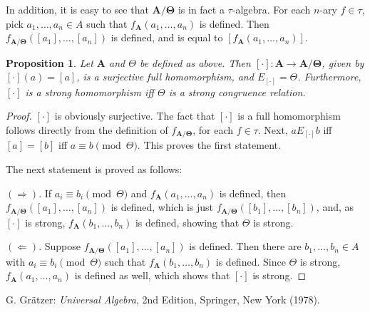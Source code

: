 \documentclass[12pt]{article}
\newtheorem{prop}{Proposition}
\begin{document}
In addition, it is easy to see that $\boldsymbol{A/\Theta}$ is in fact a $\tau$-algebra.  For each $n$-ary $f\in \tau$, pick $a_1,\ldots, a_n\in A$ such that $f_{\boldsymbol{A}}(a_1,\ldots, a_n)$ is defined.  Then $f_{\boldsymbol{A/\Theta}}([a_1],\ldots, [a_n])$ is defined, and is equal to $[f_{\boldsymbol{A}}(a_1,\ldots, a_n)]$.

\begin{prop} Let $\boldsymbol{A}$ and $\Theta$ be defined as above.  Then $[\cdot]:\boldsymbol{A}\to \boldsymbol{A/\Theta}$, given by $[\cdot](a)=[a]$, is a surjective full homomorphism, and $E_{[\cdot]}=\Theta$.  Furthermore, $[\cdot]$ is a strong homomorphism iff $\Theta$ is a strong congruence relation. \end{prop}
\begin{proof}  $[\cdot]$ is obviously surjective.  The fact that $[\cdot]$ is a full homomorphism follows directly from the definition of $f_{\boldsymbol{A/\Theta}}$, for each $f\in \tau$.  Next, $a E_{[\cdot]} b$ iff $[a]=[b]$ iff $a\equiv b \pmod{\Theta}$.  This proves the first statement.

The next statement is proved as follows:

$(\Rightarrow)$.  If $a_i\equiv b_i\pmod{\Theta}$ and $f_{\boldsymbol{A}}(a_1,\ldots, a_n)$ is defined, then $f_{\boldsymbol{A/\Theta}}([a_1],\ldots, [a_n])$ is defined, which is just $f_{\boldsymbol{A/\Theta}}([b_1],\ldots, [b_n])$, and, as $[\cdot]$ is strong, $f_{\boldsymbol{A}}(b_1,\ldots, b_n)$ is defined, showing that $\Theta$ is strong.

$(\Leftarrow)$.  Suppose $f_{\boldsymbol{A/\Theta}}([a_1],\ldots, [a_n])$ is defined.  Then there are $b_1,\ldots, b_n \in A$ with $a_i\equiv b_i \pmod{\Theta}$ such that $f_{\boldsymbol{A}}(b_1,\ldots, b_n)$ is defined.  Since $\Theta$ is strong, $f_{\boldsymbol{A}}(a_1,\ldots, a_n)$ is defined as well, which shows that $[\cdot]$ is strong.
\end{proof}

\begin{thebibliography}{7}
 G. Gr\"{a}tzer: {\em Universal Algebra}, 2nd Edition, Springer, New York (1978).
\end{thebibliography}
\end{document}
